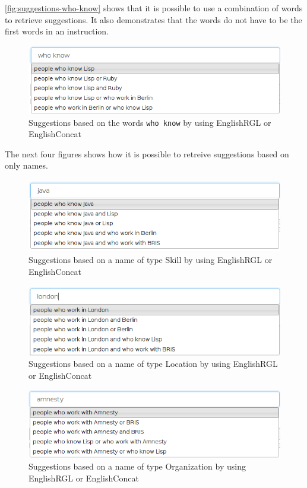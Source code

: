 \autoref{fig:suggestions-who-know} shows that it is possible to use a combination of words to retrieve suggestions. It also demonstrates that the words do not have to be the first words in an instruction.

\begin{figure}[H]
\includegraphics[scale=0.6,keepaspectratio,valign=t]{./gfx/who_know.png}
\caption{Suggestions based on the words \texttt{who know} by using EnglishRGL or EnglishConcat\label{fig:suggestions-who-know}}
\end{figure}

The next four figures shows how it is possible to retreive suggestions based on only names.

\begin{figure}[H]
\includegraphics[scale=0.6,keepaspectratio,valign=t]{./gfx/java.png}
\caption{Suggestions based on a name of type Skill by using EnglishRGL or EnglishConcat\label{fig:name-skill}}
\end{figure}

\begin{figure}[H]
\includegraphics[scale=0.6,keepaspectratio,valign=t]{./gfx/london.png}
\caption{Suggestions based on a name of type Location by using EnglishRGL or EnglishConcat\label{fig:name-location}}
\end{figure}

\begin{figure}[H]
\includegraphics[scale=0.6,keepaspectratio,valign=t]{./gfx/amnesty.png}
\caption{Suggestions based on a name of type Organization by using EnglishRGL or EnglishConcat\label{fig:name-organization}}
\end{figure}

